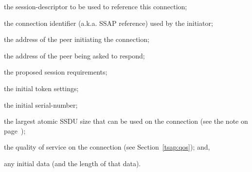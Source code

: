 \begin{describe}
\item[\verb"ss\_sd":] the session-descriptor to be used to reference this
connection;

\item[\verb"ss\_connect":] the connection identifier (a.k.a. SSAP reference)
used by the initiator;

\item[\verb"ss\_calling":] the address of the peer initiating the connection;

\item[\verb"ss\_called":] the address of the peer being asked to respond;

\item[\verb"ss\_requirements":] the proposed session requirements;

\item[\verb"ss\_settings":] the initial token settings;

\item[\verb"ss\_isn":] the initial serial-number;

\item[\verb"ss\_ssdusize":] the largest atomic SSDU size that can be used on
the connection (see the note on page~\pageref{SSDU:atomic});

\item[\verb"ss\_qos":] the quality of service on the connection
(see Section~\ref{tsap:qos});
and,

\item[\verb"ss\_data"/\verb"ss\_cc":] any initial data
(and the length of that data).
\end{describe}

